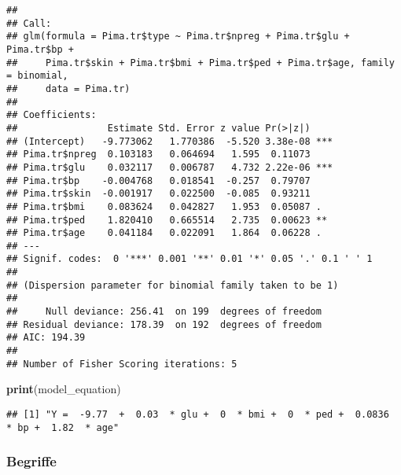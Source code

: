 \documentclass[
]{article}
\newenvironment{Shaded}{\begin{snugshade}}{\end{snugshade}}
\newcommand{\FunctionTok}[1]{\textcolor[rgb]{0.13,0.29,0.53}{\textbf{#1}}}
\newcommand{\NormalTok}[1]{#1}
\begin{document}
\begin{verbatim}
## 
## Call:
## glm(formula = Pima.tr$type ~ Pima.tr$npreg + Pima.tr$glu + Pima.tr$bp + 
##     Pima.tr$skin + Pima.tr$bmi + Pima.tr$ped + Pima.tr$age, family = binomial, 
##     data = Pima.tr)
## 
## Coefficients:
##                Estimate Std. Error z value Pr(>|z|)    
## (Intercept)   -9.773062   1.770386  -5.520 3.38e-08 ***
## Pima.tr$npreg  0.103183   0.064694   1.595  0.11073    
## Pima.tr$glu    0.032117   0.006787   4.732 2.22e-06 ***
## Pima.tr$bp    -0.004768   0.018541  -0.257  0.79707    
## Pima.tr$skin  -0.001917   0.022500  -0.085  0.93211    
## Pima.tr$bmi    0.083624   0.042827   1.953  0.05087 .  
## Pima.tr$ped    1.820410   0.665514   2.735  0.00623 ** 
## Pima.tr$age    0.041184   0.022091   1.864  0.06228 .  
## ---
## Signif. codes:  0 '***' 0.001 '**' 0.01 '*' 0.05 '.' 0.1 ' ' 1
## 
## (Dispersion parameter for binomial family taken to be 1)
## 
##     Null deviance: 256.41  on 199  degrees of freedom
## Residual deviance: 178.39  on 192  degrees of freedom
## AIC: 194.39
## 
## Number of Fisher Scoring iterations: 5
\end{verbatim}

\begin{Shaded}
\begin{Highlighting}[]
\FunctionTok{print}\NormalTok{(model\_equation)}
\end{Highlighting}
\end{Shaded}

\begin{verbatim}
## [1] "Y =  -9.77  +  0.03  * glu +  0  * bmi +  0  * ped +  0.0836  * bp +  1.82  * age"
\end{verbatim}

\subsubsection{Begriffe}\label{begriffe}
\end{document}
